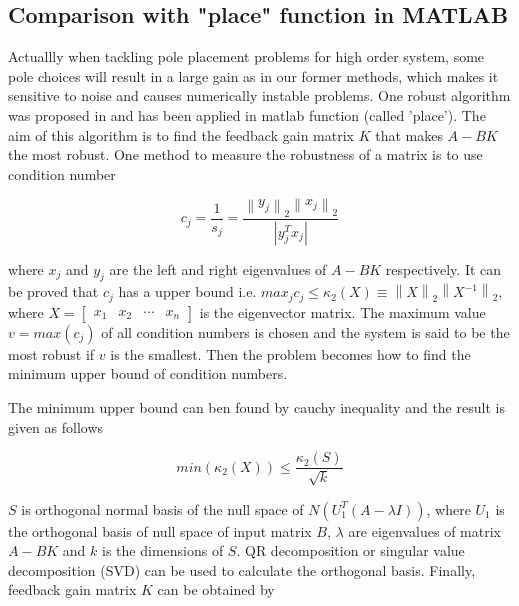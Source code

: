 \documentclass[hyperref]{article}
\theoremstyle{nonumberplain}
\begin{document}
	\subsection{Comparison with "place" function in MATLAB}
	
	\hspace{1.0em}
	Actuallly when tackling pole placement problems for high order system, some pole choices will result in a large gain as in our former methods, which makes it sensitive to noise and causes numerically instable problems. One robust algorithm was proposed in \cite{kautsky1985robust} and has been applied in matlab function (called 'place'). The aim of this algorithm is to find the feedback gain matrix $K$ that makes $A-BK$ the most robust. One method to measure the robustness of a matrix is to use condition number
	
	\begin{equation}
	c_{j}=\frac{1}{s_{j}}=\frac{\left \| y_{j} \right \|_{2} \left \| x_{j} \right \|_{2}}{\left |y_{j}^{T} x_{j}  \right |}
	\label{eq16}
	\end{equation}
	
	where $x_{j}$ and $y_{j}$ are the left and right eigenvalues of $A-BK$ respectively. It can be proved that $c_{j}$ has a upper bound i.e. $max_{j}c_{j} \leq \kappa _{2}(X)\equiv \left \| X \right \|_{2}\left \| X^{-1} \right \|_{2}$, where $X=\begin{bmatrix}
	x_{1} &x_{2}  &\cdots   & x_{n}
	\end{bmatrix}$ is the eigenvector matrix. The maximum value $v=max(c_{j})$ of all condition numbers is chosen and the system is said to be the most robust if $v$ is the smallest. Then the problem becomes how to find the minimum upper bound of condition numbers.
	
	The minimum upper bound can ben found by cauchy inequality and the result is given as follows
	
	\begin{equation}
	min ( \kappa _{2}(X)) \leq \frac{\kappa _{2}(S)}{\sqrt{k}}
	\label{eq17}
	\end{equation}
	
	$S$ is orthogonal normal basis of the null space of $N(U_{1}^{T}(A-\lambda I))$, where $U_{1}$ is the orthogonal basis of null space of input matrix $B$, $\lambda$ are eigenvalues of matrix $A-BK$ and $k$ is the dimensions of $S$. QR decomposition or singular value decomposition (SVD) can be used to calculate the orthogonal basis. Finally, feedback gain matrix $K$ can be obtained by
	
\end{document}
